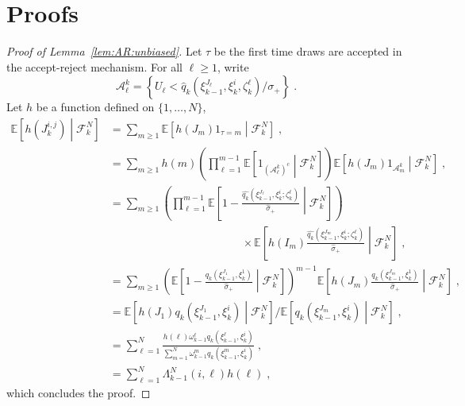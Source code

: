 \documentclass[12pt,draft]{article}
\newcommand{\eqsp}{\;}
\newcommand{\1}{\mathrm{1}}
\begin{document}
\section{Proofs}
\label{sec:append:proofs}
\begin{proof}[Proof of Lemma~\ref{lem:AR:unbiased}]
Let $\tau$ be the first time  draws are accepted in the accept-reject mechanism. For all $\ell\ge 1$, write
\[
\mathcal{A}^k_{\ell} = \left\{U_\ell<\widehat{q}_{k}(\xi_{k-1}^{J_\ell},\xi_k^{i},\zeta^{\ell}_{k})/\sigma_+\right\}\eqsp.
\]
Let $h$ be a function defined on $\{1,\ldots,N\}$,
\begin{align*}
\mathbb{E}\left[h(J^{i,j}_k)\middle| \mathcal{F}_k^N\right] & = \sum_{m\ge 1}\mathbb{E}\left[h(J_m)\1_{\tau=m}\middle| \mathcal{F}_k^N\right]\eqsp,\\
& = \sum_{m\ge 1}h(m)\left(\prod_{\ell=1}^{m-1}\mathbb{E}\left[\1_{(\mathcal{A}^k_{\ell})^c}\middle| \mathcal{F}_k^N\right]\right)\mathbb{E}\left[h(J_m)\1_{\mathcal{A}^k_{m}}\middle| \mathcal{F}_k^N\right]\eqsp,\\
& = \sum_{m\ge 1}\left(\prod_{\ell=1}^{m-1}\mathbb{E}\left[1-\frac{\widehat{q_k}(\xi_{k-1}^{J_\ell},\xi_k^{i};\zeta_k^{\ell})}{\hat{\sigma}_{+}}\middle| \mathcal{F}_k^N\right]\right)\\
&\hspace{5cm}\times\mathbb{E}\left[h(I_m)\frac{\widehat{q_k}(\xi_{k-1}^{J_m},\xi_k^{i};\zeta_k^{\ell})}{\hat{\sigma}_{+}}\middle| \mathcal{F}_k^N\right]\eqsp,\\
& = \sum_{m\ge 1}\left(\mathbb{E}\left[1-\frac{q_k(\xi_{k-1}^{J_1},\xi_k^{1})}{\hat{\sigma}_{+}}\middle| \mathcal{F}_k^N\right]\right)^{m-1}\mathbb{E}\left[h(J_m)\frac{q_k(\xi_{k-1}^{J_m},\xi_k^{1})}{\hat{\sigma}_{+}}\middle| \mathcal{F}_k^N\right]\eqsp,\\
& = \mathbb{E}\left[h(J_1)q_k(\xi_{k-1}^{J_1},\xi_k^{i})\middle| \mathcal{F}_k^N\right]/\mathbb{E}\left[q_k(\xi_{k-1}^{J_m},\xi_k^{i})\middle| \mathcal{F}_k^N\right]\eqsp,\\
& = \sum_{\ell=1}^N \frac{h(\ell)\omega_{k-1}^{\ell}q_k(\xi_{k-1}^{\ell},\xi_k^{i})}{\sum_{m=1}^N\omega_{k-1}^{m}q_k(\xi_{k-1}^{m},\xi_k^{i})}\eqsp,\\
&= \sum_{\ell=1}^N \Lambda_{k-1}^N(i,\ell)h(\ell) \eqsp,
\end{align*}
which concludes the proof.


\end{proof}
\end{document}
